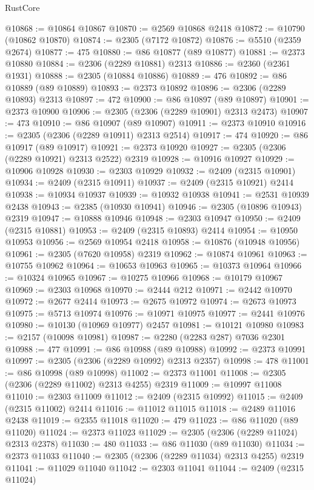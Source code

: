 \begin{lexlean}{RustCore}
\begin{coremodule}
@10868 := @10864 @10867
@10870 := @2569 @10868 @2418
@10872 := @10790 (@10862 @10870)
@10874 := @2305 (@7172 @10872)
@10876 := @5510 (@2359 @2674)
@10877 := 475
@10880 := @86 @10877 (@89 @10877)
@10881 := @2373 @10880
@10884 := @2306 (@2289 @10881) @2313
@10886 := @2360 (@2361 @1931)
@10888 := @2305 (@10884 @10886)
@10889 := 476
@10892 := @86 @10889 (@89 @10889)
@10893 := @2373 @10892
@10896 := @2306 (@2289 @10893) @2313
@10897 := 472
@10900 := @86 @10897 (@89 @10897)
@10901 := @2373 @10900
@10906 := @2305 (@2306 (@2289 @10901) @2313 @2473)
@10907 := 473
@10910 := @86 @10907 (@89 @10907)
@10911 := @2373 @10910
@10916 := @2305 (@2306 (@2289 @10911) @2313 @2514)
@10917 := 474
@10920 := @86 @10917 (@89 @10917)
@10921 := @2373 @10920
@10927 := @2305 (@2306 (@2289 @10921) @2313 @2522) @2319
@10928 := @10916 @10927
@10929 := @10906 @10928
@10930 := @2303 @10929
@10932 := @2409 (@2315 @10901)
@10934 := @2409 (@2315 @10911)
@10937 := @2409 (@2315 @10921) @2414
@10938 := @10934 @10937
@10939 := @10932 @10938
@10941 := @2531 @10939 @2438
@10943 := @2385 (@10930 @10941)
@10946 := @2305 (@10896 @10943) @2319
@10947 := @10888 @10946
@10948 := @2303 @10947
@10950 := @2409 (@2315 @10881)
@10953 := @2409 (@2315 @10893) @2414
@10954 := @10950 @10953
@10956 := @2569 @10954 @2418
@10958 := @10876 (@10948 @10956)
@10961 := @2305 (@7620 @10958) @2319
@10962 := @10874 @10961
@10963 := @10755 @10962
@10964 := @10653 @10963
@10965 := @10373 @10964
@10966 := @10324 @10965
@10967 := @10275 @10966
@10968 := @10179 @10967
@10969 := @2303 @10968
@10970 := @2444 @212
@10971 := @2442 @10970
@10972 := @2677 @2414
@10973 := @2675 @10972
@10974 := @2673 @10973
@10975 := @5713 @10974
@10976 := @10971 @10975
@10977 := @2441 @10976
@10980 := @10130 (@10969 @10977) @2457
@10981 := @10121 @10980
@10983 := @2157 (@10098 @10981)
@10987 := @2280 (@2283 @287) @7036 @2301
@10988 := 477
@10991 := @86 @10988 (@89 @10988)
@10992 := @2373 @10991
@10997 := @2305 (@2306 (@2289 @10992) @2313 @2357)
@10998 := 478
@11001 := @86 @10998 (@89 @10998)
@11002 := @2373 @11001
@11008 := @2305 (@2306 (@2289 @11002) @2313 @4255) @2319
@11009 := @10997 @11008
@11010 := @2303 @11009
@11012 := @2409 (@2315 @10992)
@11015 := @2409 (@2315 @11002) @2414
@11016 := @11012 @11015
@11018 := @2489 @11016 @2438
@11019 := @2355 @11018
@11020 := 479
@11023 := @86 @11020 (@89 @11020)
@11024 := @2373 @11023
@11029 := @2305 (@2306 (@2289 @11024) @2313 @2378)
@11030 := 480
@11033 := @86 @11030 (@89 @11030)
@11034 := @2373 @11033
@11040 := @2305 (@2306 (@2289 @11034) @2313 @4255) @2319
@11041 := @11029 @11040
@11042 := @2303 @11041
@11044 := @2409 (@2315 @11024)

\end{coremodule}
\end{lexlean}
